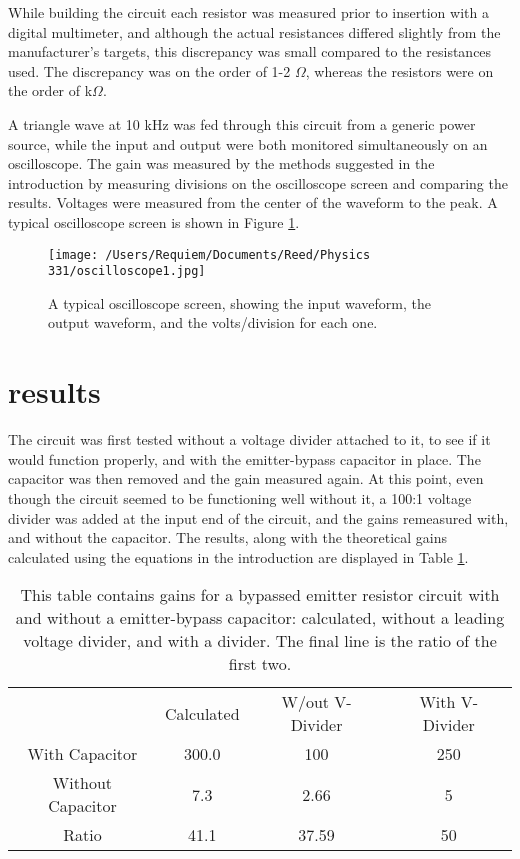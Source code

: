 \documentclass[aps,pre,twocolumn,nofootinbib]{revtex4}
\begin{document}
While building the circuit each resistor was measured prior to insertion with a digital multimeter, and although the actual resistances differed slightly from the manufacturer's targets, this discrepancy was small compared to the resistances used.  The discrepancy was on the order of 1-2 $\Omega$, whereas the resistors were on the order of k$\Omega$.  

A triangle wave at 10 kHz was fed through this circuit from a generic power source, while the input and output were both monitored simultaneously on an oscilloscope.  The gain was measured by the methods suggested in the introduction by measuring divisions on the oscilloscope screen and comparing the results.  Voltages were measured from the center of the waveform to the peak.  A typical oscilloscope screen is shown in Figure \ref{oscilloscope}.  

\begin{figure}[h]
\centering
\texttt{[image: /Users/Requiem/Documents/Reed/Physics 331/oscilloscope1.jpg]} 
\caption{A typical oscilloscope screen, showing the input waveform, the output waveform, and the volts/division for each one.}
\label{oscilloscope}
\end{figure}

\section{results}

The circuit was first tested without a voltage divider attached to it, to see if it would function properly, and with the emitter-bypass capacitor in place.  The capacitor was then removed and the gain measured again.  At this point, even though the circuit seemed to be functioning well without it, a 100:1 voltage divider was added at the input end of the circuit, and the gains remeasured with, and without the capacitor.  The results, along with the theoretical gains calculated using the equations in the introduction are displayed in Table \ref{gains}. 

\begin{table}[h]
	\caption{This table contains gains for a bypassed emitter resistor circuit with and without a emitter-bypass capacitor: calculated, without a leading voltage divider, and with a divider.  The final line is the ratio of the first two.}
\begin{ruledtabular}
	\begin{tabular}{cccc} 

  & Calculated & W/out V-Divider & With V-Divider \\
With Capacitor & 300.0 & 100 &250 \\
Without Capacitor & 7.3 & 2.66 & 5 \\
Ratio & 41.1 & 37.59 & 50 \\
	\end{tabular}
	\end{ruledtabular}
	\label{gains}
\end{table}
\end{document}
